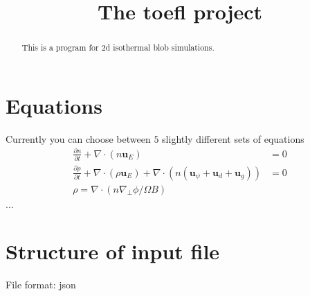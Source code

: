 \documentclass{hitec}
\renewcommand{\vec}[1]{{\mathbf{#1}}}
\begin{document}
\title{The toefl project}
\maketitle

\begin{abstract}
This is a program for 2d isothermal blob simulations.
\end{abstract}

\section{Equations}
Currently you can choose between $5$ slightly different sets of equations
\begin{align}
 \frac{\partial n}{\partial t} + \nabla\cdot\left( n \vec u_E  \right) &= 0  \\
    \frac{\partial \rho}{\partial t} + \nabla\cdot\left( \rho\vec u_E \right) + \nabla \cdot\left( n(\vec u_\psi + \vec u_d + \vec u_g) \right) &= 0\\
\rho = \nabla\cdot( n\nabla_\perp \phi / \Omega B)
\end{align}
...
\section{Structure of input file}
File format: json
\end{document}
